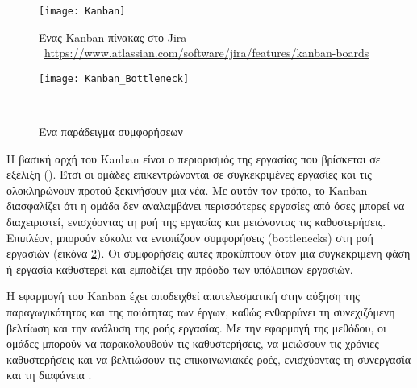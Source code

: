             \begin{figure}[h!] \noindent \centering
                \texttt{[image: Kanban]}
                \caption{\centering Ένας Kanban πίνακας στο Jira \\ {\footnotesize \textcopyright\ \url{https://www.atlassian.com/software/jira/features/kanban-boards}}}
                \label{fig:Kanban}
            \end{figure}

            \begin{figure}[h!] \noindent \centering
                \texttt{[image: Kanban\_Bottleneck]}
                \caption{Ένα παράδειγμα συμφορήσεων \cite{Agile_Stellman}}\
                \label{fig:Kanban_Bottleneck}
            \end{figure}

            Η βασική αρχή του Kanban είναι ο περιορισμός της εργασίας που βρίσκεται σε εξέλιξη (). Έτσι οι ομάδες επικεντρώνονται σε συγκεκριμένες εργασίες και τις ολοκληρώνουν προτού ξεκινήσουν μια νέα. Με αυτόν τον τρόπο, το Kanban διασφαλίζει ότι η ομάδα δεν αναλαμβάνει περισσότερες εργασίες από όσες μπορεί να διαχειριστεί, ενισχύοντας τη ροή της εργασίας και μειώνοντας τις καθυστερήσεις. Επιπλέον, μπορούν εύκολα να εντοπίζουν συμφορήσεις (bottlenecks) στη ροή εργασιών (εικόνα \ref{fig:Kanban_Bottleneck}). Οι συμφορήσεις αυτές προκύπτουν όταν μια συγκεκριμένη φάση ή εργασία καθυστερεί και εμποδίζει την πρόοδο των υπόλοιπων εργασιών.

            Η εφαρμογή του Kanban έχει αποδειχθεί αποτελεσματική στην αύξηση της παραγωγικότητας και της ποιότητας των έργων, καθώς ενθαρρύνει τη συνεχιζόμενη βελτίωση και την ανάλυση της ροής εργασίας. Με την εφαρμογή της μεθόδου, οι ομάδες μπορούν να παρακολουθούν τις καθυστερήσεις, να μειώσουν τις χρόνιες καθυστερήσεις και να βελτιώσουν τις επικοινωνιακές ροές, ενισχύοντας τη συνεργασία και τη διαφάνεια \cite{Agile_Stellman, AndersonKanban}.
